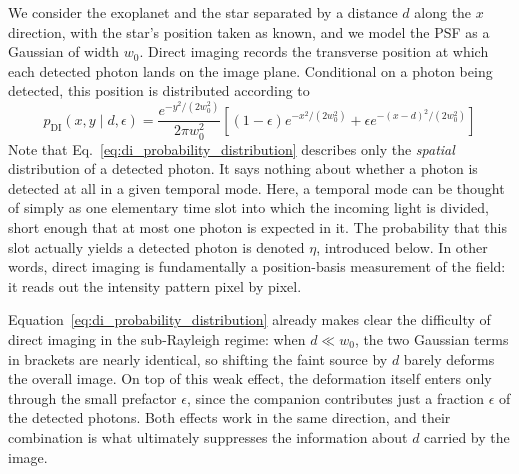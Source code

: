 We consider the exoplanet and the star separated by a distance $d$ along the $x$ direction, with the star's position taken as known, and we model the PSF as a Gaussian of width $w_0$. Direct imaging records the transverse position at which each detected photon lands on the image plane. Conditional on a photon being detected, this position is distributed according to
\begin{equation}
    p_{\mathrm{DI}}(x,y\mid d,\epsilon)
    = \frac{e^{-y^2/(2w_0^2)}}{2\pi w_0^2}
    \left[(1-\epsilon)e^{-x^2/(2w_0^2)}
        +\epsilon e^{-(x-d)^2/(2w_0^2)}\right]
    \label{eq:di_probability_distribution}
\end{equation}
Note that Eq.~\eqref{eq:di_probability_distribution} describes only the \emph{spatial} distribution of a detected photon. It says nothing about whether a photon is detected at all in a given temporal mode. Here, a temporal mode can be thought of simply as one elementary time slot into which the incoming light is divided, short enough that at most one photon is expected in it. The probability that this slot actually yields a detected photon is denoted $\eta$, introduced below. In other words, direct imaging is fundamentally a position-basis measurement of the field: it reads out the intensity pattern pixel by pixel.


Equation~\eqref{eq:di_probability_distribution} already makes clear the difficulty of direct imaging in the sub-Rayleigh regime: when $d\ll w_0$, the two Gaussian terms in brackets are nearly identical, so shifting the faint source by $d$ barely deforms the overall image. On top of this weak effect, the deformation itself enters only through the small prefactor $\epsilon$, since the companion contributes just a fraction $\epsilon$ of the detected photons. Both effects work in the same direction, and their combination is what ultimately suppresses the information about $d$ carried by the image.

